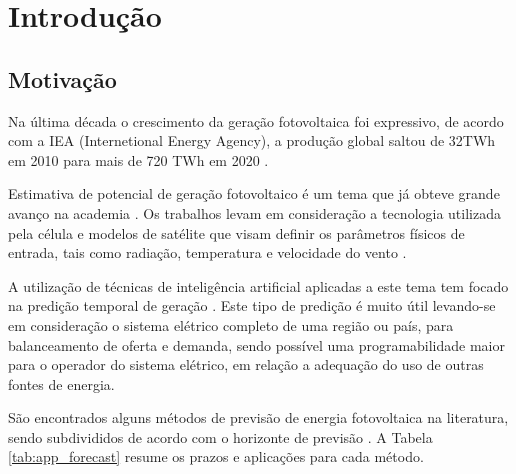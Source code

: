 \chapter{Introdução}
\label{cap:introducao}

\section{Motivação}

Na última década o crescimento da geração fotovoltaica foi expressivo, de acordo com a IEA (Internetional Energy Agency), a produção global saltou de 32TWh em 2010 para mais de 720 TWh em 2020 \cite{ieasolarpvontrack2020}. 

Estimativa de potencial de geração fotovoltaico é um tema que já obteve grande avanço na academia \cite{chin2015cell, jordehi2016parameter, de2017performance}. Os trabalhos levam em consideração a tecnologia utilizada pela célula e modelos de satélite que visam definir os parâmetros físicos de entrada, tais como radiação, temperatura e velocidade do vento \cite{mueller2009cm, huld2012new, amillo2014new, habte2017evaluation}.

A utilização de técnicas de inteligência artificial aplicadas a este tema tem focado na predição temporal de geração \cite{voyant2017machine, wolff2016statistical, li2016hierarchical}. Este tipo de predição é muito útil levando-se em consideração o sistema elétrico completo de uma região ou país, para balanceamento de oferta e demanda, sendo possível uma programabilidade maior para o operador do sistema elétrico, em relação a adequação do uso de outras fontes de energia.

São encontrados alguns métodos de previsão de energia fotovoltaica na literatura, sendo subdivididos de acordo com o horizonte de previsão \cite{mellit2020advanced}. A Tabela \ref{tab:app_forecast} resume os prazos e aplicações para cada método.

